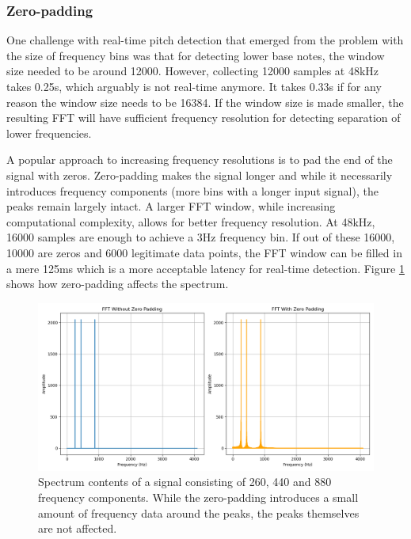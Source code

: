 \subsubsection{Zero-padding}
One challenge with real-time pitch detection that emerged from the problem with the size of frequency bins was that for detecting lower base notes, the window size needed to be around 12000. However, collecting 12000 samples at 48kHz takes 0.25s, which arguably is not real-time anymore. It takes 0.33s if for any reason the window size needs to be 16384. If the window size is made smaller, the resulting FFT will have sufficient frequency resolution for detecting separation of lower frequencies. 

A popular approach to increasing frequency resolutions is to pad the end of the signal with zeros. Zero-padding makes the signal longer and while it necessarily introduces frequency components (more bins with a longer input signal), the peaks remain largely intact. A larger FFT window, while increasing computational complexity, allows for better frequency resolution. At 48kHz, 16000 samples are enough to achieve a 3Hz frequency bin. If out of these 16000, 10000 are zeros and 6000 legitimate data points, the FFT window can be filled in a mere 125ms which is a more acceptable latency for real-time detection. Figure \ref{fig:zeropadSpectrum} shows how zero-padding affects the spectrum.

\begin{figure}[ht]
    \centering
    \includegraphics[width=\textwidth]{./images/zero_pad_spectrum.png}
    \caption{Spectrum contents of a signal consisting of 260, 440 and 880 frequency components. While the zero-padding introduces a small amount of frequency data around the peaks, the peaks themselves are not affected. \label{fig:zeropadSpectrum}}
\end{figure}

